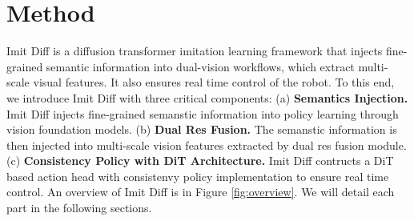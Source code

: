 
\section{Method}
\label{Method}
Imit Diff is a diffusion transformer imitation learning framework that injects fine-grained semantic information into dual-vision workflows, which extract multi-scale visual features. It also ensures real time control of the robot. To this end, we introduce Imit Diff with three critical components: (a) \textbf{Semantics Injection.} Imit Diff injects fine-grained semanstic information into policy learning through vision foundation models. (b) \textbf{Dual Res Fusion.} The semanstic information is then injected into multi-scale vision features extracted by dual res fusion module. (c) \textbf{Consistency Policy with DiT Architecture.} Imit Diff contructs a DiT based action head with consistenvy policy implementation to ensure real time control. An overview of Imit Diff is in Figure \ref{fig:overview}. We will detail each part in the following sections.

